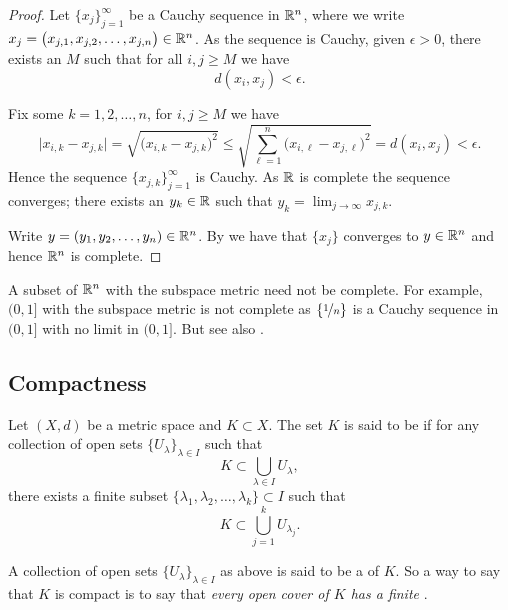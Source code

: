 \begin{proof}
Let $\{ x_j \}_{j=1}^\infty$ be a Cauchy sequence
in ${\mathbb{R}}^n$, where we write $x_j = \bigl(x_{j,1},x_{j,2},\ldots,x_{j,n}\bigr) \in {\mathbb{R}}^n$.
As the sequence is Cauchy, given $\epsilon > 0$, there exists an $M$ such that for all
$i,j \geq M$ we have
\begin{equation*}
d(x_i,x_j) < \epsilon.
\end{equation*}

Fix some $k=1,2,\ldots,n$, for $i,j \geq M$ we have
\begin{equation*}
\bigl\lvert x_{i,k} - x_{j,k} \bigr\rvert
=
\sqrt{{\bigl(x_{i,k} - x_{j,k}\bigr)}^2}
\leq
\sqrt{\sum_{\ell=1}^n {\bigl(x_{i,\ell}-x_{j,\ell}\bigr)}^2}
= d(x_i,x_j) < \epsilon .
\end{equation*}
Hence the sequence $\{ x_{j,k} \}_{j=1}^\infty$ is Cauchy.  As ${\mathbb{R}}$ is
complete the sequence converges; there exists an $y_k \in {\mathbb{R}}$ such that
$y_k = \lim_{j\to\infty} x_{j,k}$.

Write $y = (y_1,y_2,\ldots,y_n) \in {\mathbb{R}}^n$.
By  we have that $\{ x_j \}$ converges
to $y \in {\mathbb{R}}^n$ and hence ${\mathbb{R}}^n$ is complete.
\end{proof}

A subset of ${\mathbb{R}}^n$ with the subspace metric need not be
complete.  For example, $(0,1]$ with the subspace metric is not
complete as $\{ \nicefrac{1}{n} \}$ is a Cauchy sequence in $(0,1]$
with no limit in $(0,1]$.  But see also
.

\subsection{Compactness}

\begin{defn}
Let $(X,d)$ be a metric space and $K \subset X$. 
The set $K$ is said to be \emph{}
if for any collection
of open sets $\{ U_{\lambda} \}_{\lambda \in I}$ such that
\begin{equation*}
K \subset \bigcup_{\lambda \in I} U_\lambda ,
\end{equation*}
there exists a finite subset
$\{ \lambda_1, \lambda_2,\ldots,\lambda_k \} \subset I$
such that
\begin{equation*}
K \subset \bigcup_{j=1}^k U_{\lambda_j} .
\end{equation*}
\end{defn}

A collection of open sets $\{ U_{\lambda} \}_{\lambda \in I}$ as above is
said to be a \emph{} of $K$.  So a way to say that
$K$ is compact is to say that \emph{every open cover of $K$ has a finite
}.

